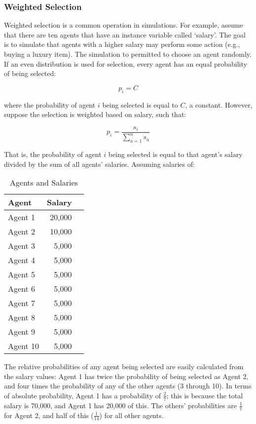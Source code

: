 \subsubsection{Weighted Selection}
Weighted selection is a common operation in simulations. 
For example, assume that there are ten agents that have an instance variable called `salary'. 
The goal is to simulate that agents with a higher salary may perform some action (e.g., buying a luxury item). 
The simulation to permitted to choose an agent randomly. 
If an even distribution is used for selection, every agent has an equal probability of being selected:

\begin{equation}
p_i = C
\end{equation}

where the probability of agent $i$ being selected is equal to $C$, a constant. However, suppose the selection is weighted based on salary, such that: 

\begin{equation}
p_i =  \frac{s_i}{\sum\limits_{a=1}^n s_a}
\end{equation}

That is, the probability of agent $i$ being selected is equal to that agent's salary divided by the sum of all agents' salaries. Assuming salaries of:

\begin{table}[H]
\begin{center}
\caption{Agents and Salaries}
\label{table:AgentsAndSalaries}
\begin{tabular}{l | r l}
\hline
 Agent & Salary \\
\hline
  Agent 1  & 20,000 \\
  Agent 2  & 10,000 \\
  Agent 3  &  5,000 \\
  Agent 4  &  5,000 \\
  Agent 5  &  5,000 \\
  Agent 6  &  5,000 \\
  Agent 7  &  5,000 \\
  Agent 8  &  5,000 \\
  Agent 9  &  5,000 \\
  Agent 10 & 5,000 \\
\end{tabular}
\end{center}
\end{table}

The relative probabilities of any agent being selected are easily calculated from the salary values: Agent 1 has twice the probability of being selected as Agent 2, and four times the probability of any of the other agents (3 through 10). In terms of absolute probability, Agent 1 has a probability of $\frac{2}{7}$; this is because the total salary is 70,000, and Agent 1 has 20,000 of this. The others' probabilities are $\frac{1}{7}$ for Agent 2, and half of this ($\frac{1}{14}$) for all other agents.


